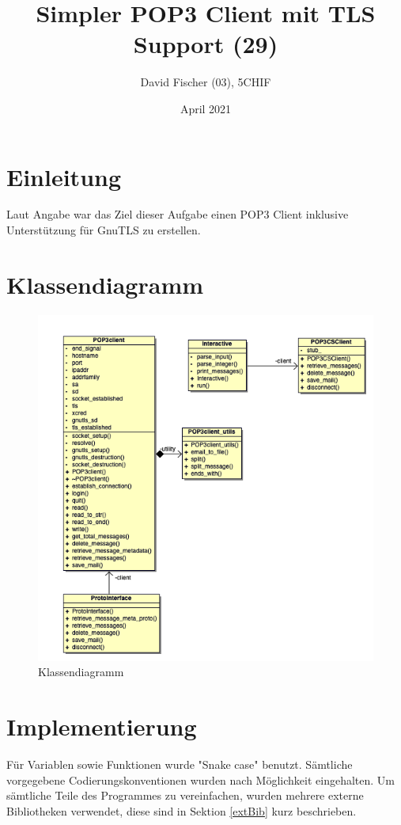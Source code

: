 \documentclass[12pt, letterpaper]{article}
\title{Simpler POP3 Client mit TLS Support (29)}
\author{David Fischer (03), 5CHIF}
\date{April 2021}
\begin{document}
\begin{titlepage}
\maketitle
\end{titlepage}

\tableofcontents
\newpage

\section{Einleitung}
Laut Angabe war das Ziel dieser Aufgabe einen POP3 Client inklusive Unterstützung für GnuTLS\cite{gnutls} zu erstellen.

\section{Klassendiagramm}

\begin{figure}[H]
  \centering
  \includegraphics[width=.7\textwidth]{kdg.png}
  \caption{Klassendiagramm}
  \label{fig:kdg}
\end{figure}

\section{Implementierung}
Für Variablen sowie Funktionen wurde "Snake case" benutzt. Sämtliche vorgegebene Codierungskonventionen wurden nach Möglichkeit eingehalten. Um sämtliche Teile des Programmes zu vereinfachen, wurden mehrere externe Bibliotheken verwendet, diese sind in Sektion \ref{extBib} kurz beschrieben. 
\end{document}
